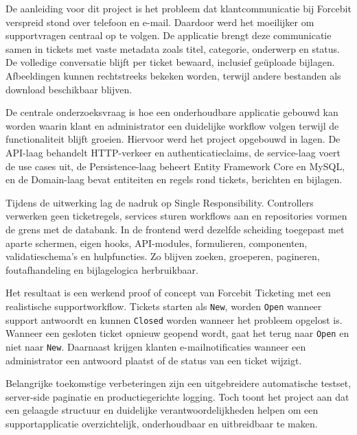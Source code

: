 \smallskip

De aanleiding voor dit project is het probleem dat klantcommunicatie bij Forcebit verspreid stond over telefoon en e-mail. Daardoor werd het moeilijker om supportvragen centraal op te volgen. De applicatie brengt deze communicatie samen in tickets met vaste metadata zoals titel, categorie, onderwerp en status. De volledige conversatie blijft per ticket bewaard, inclusief geüploade bijlagen. Afbeeldingen kunnen rechtstreeks bekeken worden, terwijl andere bestanden als download beschikbaar blijven.

\smallskip

De centrale onderzoeksvraag is hoe een onderhoudbare applicatie gebouwd kan worden waarin klant en administrator een duidelijke workflow volgen terwijl de functionaliteit blijft groeien. Hiervoor werd het project opgebouwd in lagen. De API-laag behandelt HTTP-verkeer en authenticatieclaims, de service-laag voert de use cases uit, de Persistence-laag beheert Entity Framework Core en MySQL, en de Domain-laag bevat entiteiten en regels rond tickets, berichten en bijlagen.

\smallskip

Tijdens de uitwerking lag de nadruk op Single Responsibility. Controllers verwerken geen ticketregels, services sturen workflows aan en repositories vormen de grens met de databank. In de frontend werd dezelfde scheiding toegepast met aparte schermen, eigen hooks, API-modules, formulieren, componenten, validatieschema's en hulpfuncties. Zo blijven zoeken, groeperen, pagineren, foutafhandeling en bijlagelogica herbruikbaar.

\smallskip

Het resultaat is een werkend proof of concept van Forcebit Ticketing met een realistische supportworkflow. Tickets starten als \texttt{New}, worden \texttt{Open} wanneer support antwoordt en kunnen \texttt{Closed} worden wanneer het probleem opgelost is. Wanneer een gesloten ticket opnieuw geopend wordt, gaat het terug naar \texttt{Open} en niet naar \texttt{New}. Daarnaast krijgen klanten e-mailnotificaties wanneer een administrator een antwoord plaatst of de status van een ticket wijzigt.

\smallskip

Belangrijke toekomstige verbeteringen zijn een uitgebreidere automatische testset, server-side paginatie en productiegerichte logging. Toch toont het project aan dat een gelaagde structuur en duidelijke verantwoordelijkheden helpen om een supportapplicatie overzichtelijk, onderhoudbaar en uitbreidbaar te maken.

